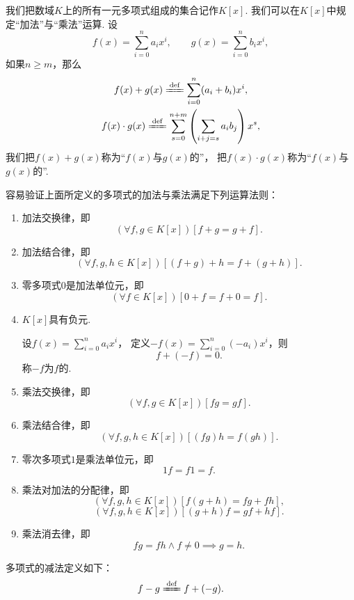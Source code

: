 我们把数域\(K\)上的所有一元多项式组成的集合记作\(K[x]\).
我们可以在\(K[x]\)中规定“加法”与“乘法”运算.
设\[
	f(x) = \sum_{i=0}^n a_i x^i, \qquad
	g(x) = \sum_{i=0}^n b_i x^i,
\]
如果\(n \ge m\)，那么\begin{gather}
	f(x) + g(x) \defeq \sum_{i=0}^n (a_i+b_i) x^i, \\
	f(x) \cdot g(x) \defeq \sum_{s=0}^{n+m} \left( \sum_{i+j=s} a_i b_j \right) x^s,
\end{gather}
我们把\(f(x)+g(x)\)称为“\(f(x)\)与\(g(x)\)的”，
把\(f(x) \cdot g(x)\)称为“\(f(x)\)与\(g(x)\)的”.

容易验证上面所定义的多项式的加法与乘法满足下列运算法则：
\begin{enumerate}
	\item 加法交换律，即\[
		(\forall f,g \in K[x])[f+g=g+f].
	\]

	\item 加法结合律，即\[
		(\forall f,g,h \in K[x])[(f+g)+h=f+(g+h)].
	\]

	\item 零多项式\(0\)是加法单位元，即\[
		(\forall f \in K[x])[0+f=f+0=f].
	\]

	\item \(K[x]\)具有负元.

	设\(f(x)=\sum_{i=0}^n a_i x^i\)，
	定义\(-f(x)=\sum_{i=0}^n (-a_i) x^i\)，则\[
		f+(-f)=0.
	\]
	称\(-f\)为\(f\)的.

	\item 乘法交换律，即\[
		(\forall f,g \in K[x])[fg=gf].
	\]

	\item 乘法结合律，即\[
		(\forall f,g,h \in K[x])[(fg)h=f(gh)].
	\]

	\item 零次多项式\(1\)是乘法单位元，即\[
		1f=f1=f.
	\]

	\item 乘法对加法的分配律，即\[
		(\forall f,g,h \in K[x])[f(g+h)=fg+fh],
	\]\[
		(\forall f,g,h \in K[x])[(g+h)f=gf+hf].
	\]

	\item 乘法消去律，即\[
		fg=fh \land f\neq0 \implies g=h.
	\]
\end{enumerate}

多项式的减法定义如下：\begin{equation}
	f-g \defeq f+(-g).
\end{equation}

